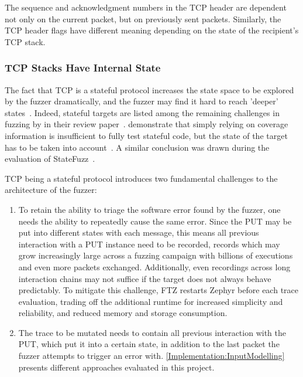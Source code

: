 \documentclass[twocolumn]{article}
\newcommand{\proj}{FTZ\xspace}
\let\savedCite=\cite
\renewcommand{\cite}{\unskip~\savedCite}
\begin{document}
The sequence and acknowledgment numbers in the TCP header are dependent not only on the current packet, but on previously sent packets. Similarly, the TCP header flags have different meaning depending on the state of the recipient's TCP stack.

\subsubsection{TCP Stacks Have Internal State}
\label{Background:TcpIsStateful}

The fact that TCP is a stateful protocol increases the state space to be explored by the fuzzer dramatically, and the fuzzer may find it hard to reach 'deeper' states\cite{StatefulReview}. Indeed, stateful targets are listed among the remaining challenges in fuzzing by \citeauthor{ChallengesAndReflections} in their review paper\cite{ChallengesAndReflections}. \citeauthor{SGFuzz} demonstrate that simply relying on coverage information is insufficient to fully test stateful code, but the state of the target has to be taken into account\cite{SGFuzz}. A similar conclusion was drawn during the evaluation of StateFuzz\cite{StateFuzz}.

TCP being a stateful protocol introduces two fundamental challenges to the architecture of the fuzzer:
\begin{enumerate}
  \item To retain the ability to triage the software error found by the fuzzer, one needs the ability to repeatedly cause the same error. Since the PUT may be put into different states with each message, this means all previous interaction with a PUT instance need to be recorded, records which may grow increasingly large across a fuzzing campaign with billions of executions and even more packets exchanged. Additionally, even recordings across long interaction chains may not suffice if the target does not always behave predictably. To mitigate this challenge, \proj restarts Zephyr before each trace evaluation, trading off the additional runtime for increased simplicity and reliability, and reduced memory and storage consumption.
  \item The trace to be mutated needs to contain all previous interaction with the PUT, which put it into a certain state, in addition to the last packet the fuzzer attempts to trigger an error with. \cref{Implementation:InputModelling} presents different approaches evaluated in this project.
\end{enumerate}
\end{document}
